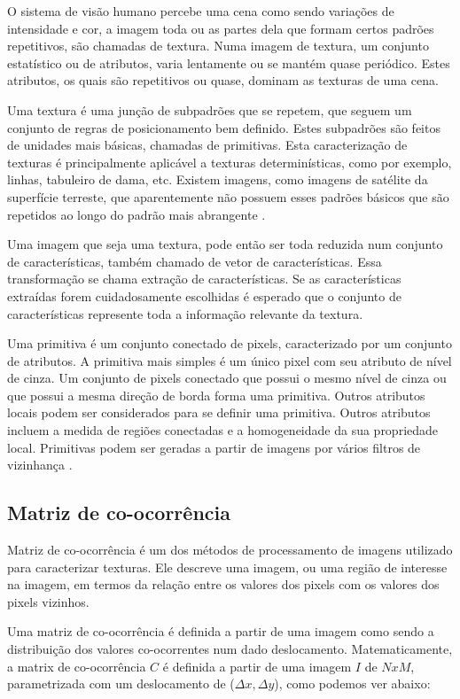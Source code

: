 O sistema de visão humano percebe uma cena como sendo variações de intensidade e cor, a imagem toda ou as partes dela que formam certos padrões repetitivos, são chamadas de textura. Numa imagem de textura, um conjunto estatístico ou de atributos, varia lentamente ou se mantém quase periódico. Estes atributos, os quais são repetitivos ou quase, dominam as texturas de uma cena.

Uma textura é uma junção de subpadrões que se repetem, que seguem um conjunto de regras de posicionamento bem definido. Estes subpadrões são feitos de unidades mais básicas, chamadas de primitivas. Esta caracterização de texturas é principalmente aplicável a texturas determinísticas, como por exemplo, linhas, tabuleiro de dama, etc. Existem imagens, como imagens de satélite da superfície terreste, que aparentemente não possuem esses padrões básicos que são repetidos ao longo do padrão mais abrangente \cite{acharya}.

Uma imagem que seja uma textura, pode então ser toda reduzida num conjunto de características, também chamado de vetor de características. Essa transformação se chama extração de características. Se as características extraídas forem cuidadosamente escolhidas é esperado que o conjunto de características represente toda a informação relevante da textura.

Uma primitiva é um conjunto conectado de pixels, caracterizado por um conjunto de atributos. A primitiva mais simples é um único pixel com seu atributo de nível de cinza. Um conjunto de pixels conectado que possui o mesmo nível de cinza ou que possui a mesma direção de borda forma uma primitiva. Outros atributos locais podem ser considerados para se definir uma primitiva. Outros atributos incluem a medida de regiões conectadas e a homogeneidade da sua propriedade local. Primitivas podem ser geradas a partir de imagens por vários filtros de vizinhança \cite{acharya}.

\subsection{Matriz de co-ocorrência}

Matriz de co-ocorrência é um dos métodos de processamento de imagens utilizado para caracterizar texturas. Ele descreve uma imagem, ou uma região de interesse na imagem, em termos da relação entre os valores dos pixels com os valores dos pixels vizinhos.

Uma matriz de co-ocorrência é definida a partir de uma imagem como sendo a distribuição dos valores co-ocorrentes num dado deslocamento. Matematicamente, a matrix de co-ocorrência $C$ é definida a partir de uma imagem $I$ de $N x M$, parametrizada com um deslocamento de ($\Delta{}x,\Delta{}y$), como podemos ver abaixo:

